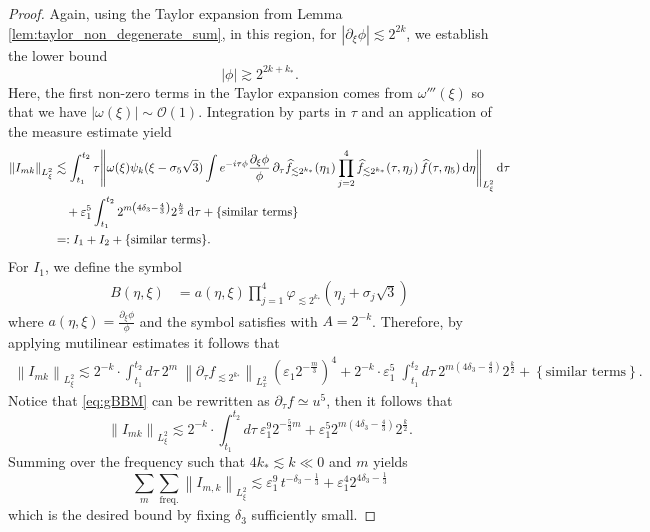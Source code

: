 \documentclass[reqno,english,11pt]{amsart}
\newcommand{\eps}{\varepsilon}
\newcommand{\snorm}[1]{\left\|#1\right\|}
\theoremstyle{definition}
\numberwithin{equation}{section}
\begin{document}
\begin{proof}
Again, using  the Taylor expansion from Lemma \ref{lem:taylor_non_degenerate_sum}, in this region, for  $|\partial_\xi \phi|\lesssim 2^{2k}$,  we establish the lower bound
\begin{equation}\label{eqn:non_deg_case_2_phase_bnd} 
|\phi|\gtrsim 2^{2k+k_*}. 
\end{equation}
Here, the first non-zero terms in the Taylor expansion comes from $\omega'''(\xi)$ so that we have $|\omega(\xi)|\sim \mathcal{O}(1)$.  Integration by parts in $\tau$ and an application of the measure estimate yield
\begin{align*}
\snorm{I_{mk}}_{L^2_\xi}&\lesssim\int_{t_1}^{t_2}\tau\Bigg\|\omega(\xi)\psi_k(\xi-\sigma_5\sqrt{3})\int e^{-i\tau\phi}\frac{\partial_\xi\phi}{\phi}\,\partial_\tau \widehat f_{\lesssim 2^{k_*}}(\eta_1)\prod_{j=2}^4 \widehat f_{\lesssim 2^{k_*}}(\tau,\eta_j)\,\widehat f(\tau,\eta_5)\,\mathrm d\eta\Bigg\|_{L^2_\xi}\,\mathrm d\tau \\
&\quad+ \varepsilon_1^5\int_{t_1}^{t_2}2^{m\left(4\delta_3-\frac{4}{3}\right)}2^{\frac{k}{2}}\,\mathrm d\tau+ \{\textnormal{similar terms}\}\\
&=:I_1+I_2+ \{\textnormal{similar terms}\}.
\end{align*}
For $I_1$, we define the symbol
\begin{align*}
B(\eta,\xi) &= a(\eta,\xi) \prod^{4}_{j=1}\varphi_{\lesssim 2^{k_*}}(\eta_j +\sigma_j \sqrt{3})
\end{align*}
where $a(\eta,\xi)=\frac{\partial_\xi \phi}{\phi}$ and the symbol satisfies \cite[Lemma B.3]{Morgan} with $A=2^{-k}$. Therefore, by applying mutilinear estimates it follows that 
\begin{multline*}
     \snorm{I_{mk}}_{L^2_{\xi}}
    \lesssim 2^{-k}\cdot \int_{t_1}^{t_2}d \tau \ 2^{m} \ \snorm{\partial_{\tau}f_{\lesssim 2^{k_{*}}}}_{L^2_{x}} \ \left(\eps_1 2^{-\frac{m}{3}}\right)^4 
    + 2^{-k}\cdot\eps_1^5\;\int_{t_1}^{t_2} d \tau \ 2^{m\left(4\delta_3-\frac{4}{3}\right)}2^{\frac{k}{2}} + \left\{\text{similar terms}\right\}. 
\end{multline*}
Notice that \eqref{eq:gBBM} can be rewritten as $\partial_{\tau}f \simeq u^5$, then it follows that
\begin{equation*}
     \snorm{I_{mk}}_{L^2_{\xi}}\lesssim 2^{-k}\cdot \int_{t_1}^{t_2}d \tau \ \eps_1^9 2^{-\frac{5}{3}m} +\eps_1^5 2^{m\left(4\delta_3-\frac{4}{3}\right)}2^{\frac{k}{2}}.
\end{equation*}
Summing over the frequency such that $4k_*\lesssim k\ll 0$ and $m$ yields
\begin{equation*}
    \sum_m\sum_{\operatorname{freq.}}\snorm{I_{m,k}}_{L^2_\xi}\lesssim \eps_1^9 \, t^{-\delta_3-\frac{1}{3}}+\eps_1^4 2^{4\delta_3 - \frac{1}{3}}
\end{equation*}
which is the desired bound by fixing $\delta_3$ sufficiently small.


\end{proof}
\end{document}

